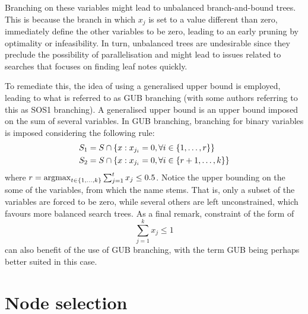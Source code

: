 Branching on these variables might lead to unbalanced branch-and-bound trees. This is because the branch in which $x_j$ is set to a value different than zero, immediately define the other variables to be zero, leading to an early pruning by optimality or infeasibility. In turn, unbalanced trees are undesirable since they preclude the possibility of parallelisation and might lead to issues related to searches that focuses on finding leaf notes quickly.

To remediate this, the idea of using a generalised upper bound is employed, leading to what is referred to as GUB branching (with some authors referring to this as SOS1 branching). A generalised upper bound is an upper bound imposed on the sum of several variables. In GUB branching, branching for binary variables is imposed considering the following rule:
%
\begin{align*}
	&S_1 = S \cap \left\{ x : x_{j_i} = 0, \forall i \in \left\{ 1,\dots,r \right \}  \right \} \\
	&S_2 = S \cap \left\{ x : x_{j_i} = 0, \forall i \in \left\{ r+1,\dots,k \right \}  \right \}
\end{align*} 
%
where $r = \mathop{\rm argmax}_{t \in \left\{ 1,\dots,k \right \}} \sum_{j=1}^t x_j \leq 0.5$. Notice the upper bounding on the some of the variables, from which the name stems. That is, only a subset of the variables are forced to be zero, while several others are left unconstrained, which favours more balanced search trees. As a final remark, constraint of the form of
%
\begin{equation*}
	\sum_{j = 1}^k x_j \le 1	
\end{equation*}
%
can also benefit of the use of GUB branching, with the term GUB being perhaps better suited in this case. 


\section{Node selection}

